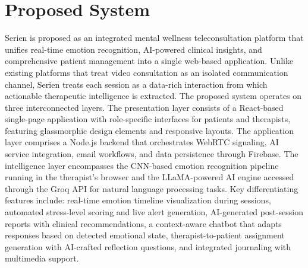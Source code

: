\documentclass[conference]{IEEEtran}
\begin{document}
\section{Proposed System}
Serien is proposed as an integrated mental wellness teleconsultation platform that unifies real-time emotion recognition, AI-powered clinical insights, and comprehensive patient management into a single web-based application. Unlike existing platforms that treat video consultation as an isolated communication channel, Serien treats each session as a data-rich interaction from which actionable therapeutic intelligence is extracted.
The proposed system operates on three interconnected layers. The presentation layer consists of a React-based single-page application with role-specific interfaces for patients and therapists, featuring glassmorphic design elements and responsive layouts. The application layer comprises a Node.js backend that orchestrates WebRTC signaling, AI service integration, email workflows, and data persistence through Firebase. The intelligence layer encompasses the CNN-based emotion recognition pipeline running in the therapist's browser and the LLaMA-powered AI engine accessed through the Groq API for natural language processing tasks.
Key differentiating features include: real-time emotion timeline visualization during sessions, automated stress-level scoring and live alert generation, AI-generated post-session reports with clinical recommendations, a context-aware chatbot that adapts responses based on detected emotional state, therapist-to-patient assignment generation with AI-crafted reflection questions, and integrated journaling with multimedia support.
\end{document}
